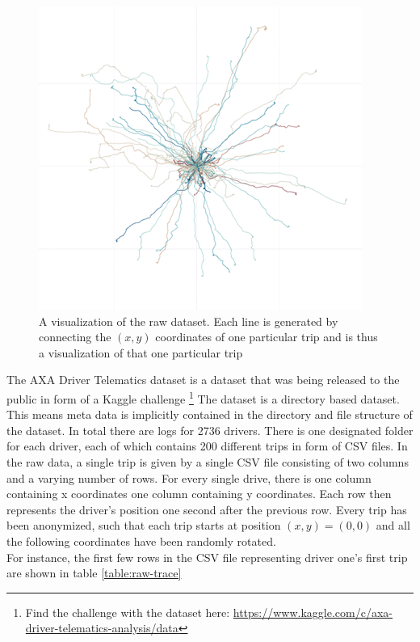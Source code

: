 \documentclass{vldb}
\begin{document}
\begin{figure}
\centering
\includegraphics[width=\linewidth]{"pics/axa-trip"}
\caption{A visualization of the raw dataset. Each line is generated by connecting the $(x,y)$ coordinates of one particular trip and is thus a visualization of that one particular trip}
\label{fig:axa-trip}
\end{figure}

The AXA Driver Telematics dataset is a dataset that was being released to the public in form of a Kaggle challenge 
\footnote{Find the challenge with the dataset here: \url{https://www.kaggle.com/c/axa-driver-telematics-analysis/data}}
The dataset is a directory based dataset. This means meta data is implicitly contained in the directory and file structure of the dataset. In total there are logs for 2736 drivers. There is one designated folder for each driver, each of which contains 200 different trips in form of CSV files. In the raw data, a single trip is given by a single CSV file consisting of two columns and a varying number of rows. For every single drive, there is one column containing x coordinates one column containing y coordinates. Each row then represents the driver's position one second after the previous row. Every trip has been anonymized, such that each trip starts at position $(x, y) = (0, 0)$ and all the following coordinates have been randomly rotated.\\ 
For instance, the first few rows in the CSV file representing driver one's first trip are shown in table \ref{table:raw-trace}
\end{document}
